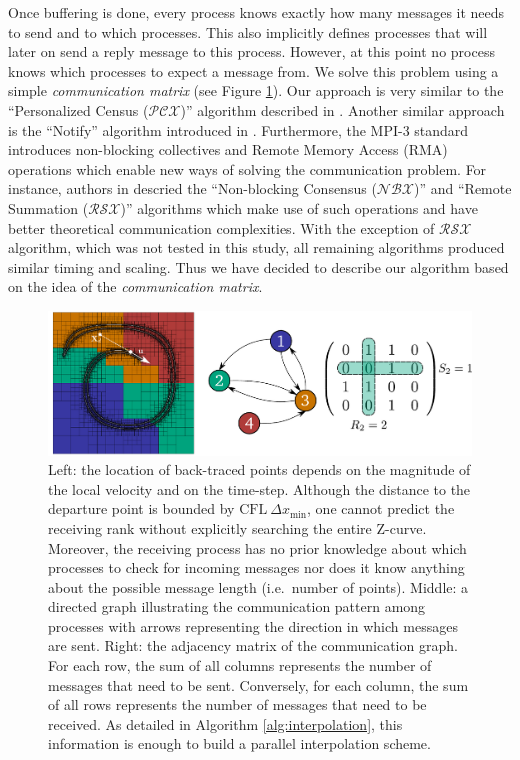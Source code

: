 Once buffering is done, every process knows exactly how many messages it needs to send and to which processes. This also implicitly defines processes that will later on send a reply message to this process. However, at this point no process knows which processes to expect a message from. We solve this problem using a simple \textit{communication matrix} (see Figure \ref{fig:communication}). Our approach is very similar to the ``Personalized Census ($\mathcal{PCX}$)'' algorithm described in \cite{Hoefler;Siebert;Lumsdaine:10:Scalable-communication}. Another similar approach is the ``Notify'' algorithm introduced in \cite{Isaac;Burstedde;Ghattas:12:Low-cost-parallel-al}. Furthermore, the MPI-3 standard introduces non-blocking collectives and Remote Memory Access (RMA) operations which enable new ways of solving the communication problem. For instance, authors in \cite{Hoefler;Siebert;Lumsdaine:10:Scalable-communication} descried the ``Non-blocking Consensus ($\mathcal{NBX}$)'' and ``Remote Summation ($\mathcal{RSX}$)'' algorithms which make use of such operations and have better theoretical communication complexities. With the exception of $\mathcal{RSX}$ algorithm, which was not tested in this study, all remaining algorithms produced similar timing and scaling. Thus we have decided to describe our algorithm based on the idea of the \textit{communication matrix}.

\begin{figure}[htbp]
\begin{center}
\includegraphics[width = \textwidth] {figures/communication.pdf}
\end{center}
\caption{Left: the location of back-traced points depends on the magnitude of the local velocity and on the time-step. Although the distance to the departure point is bounded by $\text{CFL} \: \Delta x_{\min}$, one cannot predict the receiving rank without explicitly searching the entire Z-curve. Moreover, the receiving process has no prior knowledge about which processes to check for incoming messages nor does it know anything about the possible message length (i.e.\ number of points). Middle: a directed graph illustrating the communication pattern among processes with arrows representing the direction in which messages are sent. Right: the adjacency matrix of the communication graph. For each row, the sum of all columns represents the number of messages that need to be sent. Conversely, for each column, the sum of all rows represents the number of messages that need to be received. As detailed in Algorithm \ref{alg:interpolation}, this information is enough to build a parallel interpolation scheme.}
\label{fig:communication}
\end{figure}

